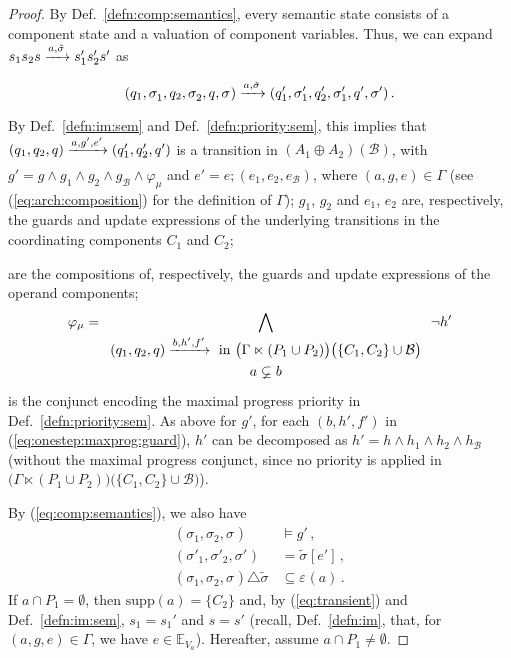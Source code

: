 \documentclass{llncs}
\newcommand{\defn}[1]{Def.~\ref{defn:#1}}
\newcommand{\eq}[1]{(\ref{eq:#1})}
\newcommand{\cB}{\ensuremath{\mathcal{B}}}
\newcommand{\sE}{\ensuremath{\mathbb{E}}}
\newcommand{\goesto}[2][]{\ensuremath{\xrightarrow[{#1}\relax]{#2}}}
\newcommand{\exprs}[1]{\ensuremath{\sE_{#1}}}
\newcommand{\val}[3][]{\ensuremath{#1{\sigma}^{#2}_{#3}}}
\newcommand{\primeit}[1]{#1'}
\newcommand{\export}[1][]{\ensuremath{\varepsilon_{#1}}}
\newcommand{\valdiff}[2]{\ensuremath{#1 \triangle #2}}
\newcommand{\supp}[1]{\ensuremath{\mathrm{supp}(#1)}}
\newcommand{\IMextend}[2]{\ensuremath{#1 \ltimes #2}}
\newcommand{\arcomp}{\oplus}
\begin{document}
\begin{proof}
  By \defn{comp:semantics}, every semantic state consists of a
  component state and a valuation of component variables.  Thus,
  we can expand $s_1 s_2 s \goesto{a, \tilde{\val{}{}}} s_1' s_2' s'$
  as
%
  \[
  (q_1, \val{}{1}, q_2, \val{}{2}, q, \val{}{})
%
  \goesto{a, \tilde{\val{}{}}}
%
  (q_1', \val[\primeit]{}{1}, q_2', \val[\primeit]{}{1}, q', \val[\primeit]{}{})
  \,.
  \]
%
  By \defn{im:sem} and \defn{priority:sem}, this implies
  that
  $(q_1, q_2, q) \goesto {a, g', e'} (q_1', q_2', q')$
  is a transition in $(A_1 \arcomp A_2)(\cB)$, with
%
  $g' = g \land g_1 \land g_2 \land g_\cB \land \varphi_\mu$
  and
  $e' = e; (e_1, e_2, e_\cB)$,
  where $(a, g, e) \in \Gamma$ (see \eq{arch:composition} for the
  definition of $\Gamma$);
%  
  $g_1$, $g_2$ and $e_1$, $e_2$ are, respectively, the guards and
  update expressions of the underlying transitions in the coordinating
  components $C_1$ and $C_2$;
%    
%
  are the compositions of, respectively, the guards and update
  expressions of the operand components;
%    
  \begin{equation}
    \label{eq:onestep:maxprog:guard}
    \varphi_\mu = \bigwedge_{
      \begin{array}{c}
        (q_1, q_2, q) \goesto{b, h', f'} \text{ in }
        \bigl(\IMextend{\Gamma}{(P_1 \cup P_2)}\bigr)
        \bigl(\{C_1, C_2\} \cup \cB\bigr)
        \\
        a \varsubsetneq b
      \end{array}
    } \lnot h'
  \end{equation}
%
  is the conjunct encoding the maximal progress priority in
  \defn{priority:sem}.  As above for $g'$, for each $(b, h', f')$ in
  \eq{onestep:maxprog:guard}, $h'$ can be decomposed as $h' = h \land
  h_1 \land h_2 \land h_\cB$ (without the maximal progress conjunct,
  since no priority is applied in $\bigl(\IMextend{\Gamma}{(P_1 \cup
    P_2)}\bigr)\bigl(\{C_1, C_2\} \cup \cB\bigr)$).
  
  By \eq{comp:semantics}, we also have
%
  \begin{align}
    \label{eq:guard}
    (\val{}{1}, \val{}{2}, \val{}{}) &\models g'
    \,,
    \\
    \label{eq:substitution}
    (\val[\primeit]{}{1}, \val[\primeit]{}{2}, \val[\primeit]{}{})
    &= \val[\tilde]{}{}[e']
    \,,
    \\
    \label{eq:transient}
    \valdiff{(\val{}{1}, \val{}{2}, \val{}{})}{\val[\tilde]{}{}}
    &\subseteq \export(a)
    \,.
  \end{align}
%
  If $a \cap P_1 = \emptyset$, then $\supp{a} = \{C_2\}$ and, by
  \eq{transient} and \defn{im:sem}, $s_1 = s_1'$ and $s = s'$
  (recall, \defn{im}, that, for $(a,g,e) \in \Gamma$, we have $e
  \in \exprs{V_a}$).  Hereafter, assume $a \cap P_1 \neq
  \emptyset$.


\end{proof}
\end{document}
